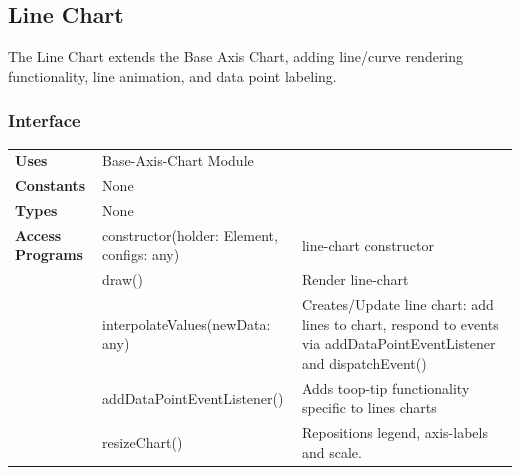\documentclass[12pt, titlepage]{article}
\begin{document}
\subsection{Line Chart}
The Line Chart extends the Base Axis Chart, adding line/curve rendering functionality, line animation, and data point labeling. 
\subsubsection{Interface}
\begin{table}[H]
\begin{tabular}{l p{5cm}p{5cm}}
\textbf{Uses}            & Base-Axis-Chart Module                     &                                                                                                                  \\
\textbf{Constants}       & None                             &                                                                                                     \\
                         
\textbf{Types}           & None                                       &                                                                                                                  \\
\textbf{Access Programs} & constructor(holder: Element, configs: any) & line-chart constructor                                                                                            \\
                         & draw()                                     & Render line-chart                                                                                                 \\
                         & interpolateValues(newData: any)            & Creates/Update line chart: add lines to chart, respond to events via addDataPointEventListener and dispatchEvent() \\
                         & addDataPointEventListener()                & Adds toop-tip functionality specific to lines charts                                                               \\
                         & resizeChart()                              & Repositions legend, axis-labels and scale.\\                                                                     
\end{tabular}
\end{table}
\end{document}
